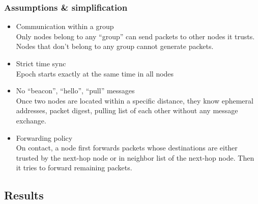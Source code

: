 \documentclass[11pt]{article}
\begin{document}
\subsubsection{Assumptions \& simplification}
\begin{itemize}
 \item Communication within a group\\
Only nodes belong to any ``group'' can send packets to other nodes it trusts. 
Nodes that don't belong to any group cannot generate packets.

 \item Strict time sync\\
Epoch starts exactly at the same time in all nodes

 \item No ``beacon'', ``hello'', ``pull'' messages\\
Once two nodes are located within a specific distance, they know ephemeral addresses, packet digest, pulling list of each other without any message exchange. 

 \item Forwarding policy\\
On contact, a node first forwards packets whose destinations are either trusted by the next-hop node or in neighbor list of the next-hop node.  Then it tries to forward remaining packets. 
\end{itemize}


\subsection{Results}
\end{document}
